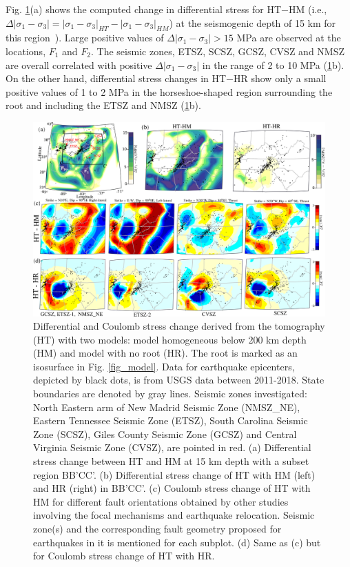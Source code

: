 \documentclass[draft,linenumbers]{agujournal2018}
\begin{document}
Fig. \ref{model_results}(a) shows the computed change in differential stress for HT$-$HM (i.e., $\Delta|\sigma_1 - \sigma_3| = |\sigma_1 - \sigma_3|_{HT} - |\sigma_1 - \sigma_3|_{HM}$) at the seismogenic depth of 15 km for this region~\citep[e.g.,][]{mazzotti2010state}). Large positive values of $\Delta |\sigma_1 - \sigma_3|>15$ MPa are observed at the locations, $F_1$ and $F_2$.  The seismic zones, ETSZ, SCSZ, GCSZ, CVSZ and NMSZ are overall correlated with positive $\Delta |\sigma_1 - \sigma_3|$ in the range of 2 to 10 MPa (\ref{model_results}b). On the other hand, differential stress changes in HT$-$HR show only a small positive values of 1 to 2 MPa in the horseshoe-shaped region surrounding the root and including the ETSZ and NMSZ (\ref{model_results}b).
%
\begin{figure}[h!]
    \centering
    \includegraphics[width=\linewidth]{figures/model_results.png}
    \caption{Differential and Coulomb stress change derived from the tomography (HT) with two models: model homogeneous below 200 km depth (HM) and model with no root (HR). The root is marked as an isosurface in Fig. \ref{fig_model}. Data for earthquake epicenters, depicted by black dots, is from USGS data between 2011-2018. State boundaries are denoted by gray lines. Seismic zones investigated: North Eastern arm of New Madrid Seismic Zone (NMSZ\_NE), Eastern Tennessee Seismic Zone (ETSZ), South Carolina Seismic Zone (SCSZ), Giles County Seismic Zone (GCSZ) and Central Virginia Seismic Zone (CVSZ), are pointed in red. (a) Differential stress change between HT and HM at 15 km depth with a subset region BB'CC'. (b) Differential stress change of HT with HM (left) and HR (right) in BB'CC'. (c) Coulomb stress change of HT with HM for different fault orientations obtained by other studies involving the focal mechanisms and earthquake relocation. Seismic zone(s) and the corresponding fault geometry proposed for earthquakes in it is mentioned for each subplot. (d) Same as (c) but for Coulomb stress change of HT with HR. }
    \label{model_results}
\end{figure}
\end{document}
